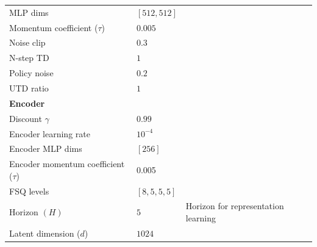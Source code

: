 \documentclass{article}
\theoremstyle{plain}
\theoremstyle{definition}
\theoremstyle{remark}
\begin{document}
\begin{table}[h]
\begin{center}
\begin{small}
\begin{sc}
\begin{tabular}{lll}
MLP dims & $[512, 512]$ & \\
Momentum coefficient ($\tau$) & $0.005$ & \\
Noise clip & $0.3$ & \\
N-step TD & $1$ & \\
Policy noise & $0.2$ & \\
UTD ratio & $1$ & \\
\hline
\textbf{Encoder} &  & \\
Discount $\gamma$ & $0.99$ & \\
Encoder learning rate & $10^{-4}$ & \\
Encoder MLP dims & $[256]$ & \\
Encoder momentum coefficient ($\tau$) & 0.005 & \\
FSQ levels & $[8, 5, 5, 5]$ & \\
Horizon $(H)$ & $5$ & Horizon for representation learning \\
Latent dimension ($d$) & $1024$ & \\
 \bottomrule
\end{tabular}
\end{sc}
\end{small}
\end{center}
\vskip -0.1in
\end{table}




\end{document}
